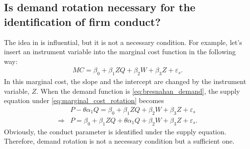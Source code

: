 \documentclass[11pt, a4paper]{article}
\theoremstyle{remark}
\begin{document}
\subsection{Is demand rotation necessary for the identification of firm conduct?}




The idea in \citet{bresnahan1982oligopoly} is influential, but it is not a necessary condition.
For example, let's insert an instrument variable into the marginal cost function in the following way:
\begin{align}
    MC= \beta_0 + \beta_1 ZQ + \beta_2 W + \beta_3 Z + \varepsilon_s. \label{eq:marginal_cost_rotation}
\end{align}
In this marginal cost, the slope and the intercept are changed by the instrument variable, $Z$.
When the demand function is \eqref{eq:bresnahan_demand}, the supply equation under \eqref{eq:marginal_cost_rotation} becomes
\begin{align}
    & P - \theta\alpha_1 Q = \beta_0 + \beta_1 ZQ + \beta_2 W + \beta_3 Z + \varepsilon_s\\
    \Longrightarrow & P = \beta_0 + \beta_1 Z Q + \theta \alpha_1 Q + \beta_2 W + \beta_3 Z+ \varepsilon_s.
\end{align}
Obviously, the conduct parameter is identified under the supply equation.
Therefore, demand rotation is not a necessary condition but a sufficient one.
\end{document}
